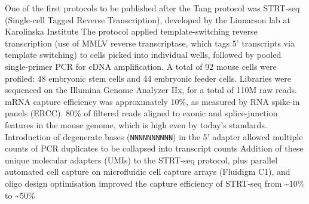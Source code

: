 One of the first protocols to be published after the Tang protocol was STRT-seq (Single-cell Tagged Reverse Transcription), developed by the Linnarson lab at Karolinska Institute The protocol applied template-switching reverse transcription (use of MMLV reverse transcriptase, which tags 5' transcripts via template switching) to cells picked into individual wells, followed by pooled single-primer PCR for cDNA amplification. A total of 92 mouse cells were profiled: 48 embryonic stem cells and 44 embryonic feeder cells. Libraries were sequenced on the Illumina Genome Analyzer IIx, for a total of 110M raw reads. mRNA capture efficiency was approximately 10\%, as measured by RNA spike-in panels (ERCC). 80\% of filtered reads aligned to exonic and splice-junction features in the mouse genome, which is high even by today's standards. Introduction of degenerate bases (\verb|NNNNNNNNNN|) in the 5' adapter allowed multiple counts of PCR duplicates to be collapsed into transcript counts Addition of these unique molecular adapters (UMIs) to the STRT-seq protocol, plus parallel automated cell capture on microfluidic cell capture arrays (Fluidigm C1), and oligo design optimisation improved the capture efficiency of STRT-seq from \textasciitilde{10}\% to \textasciitilde{50}\% 



